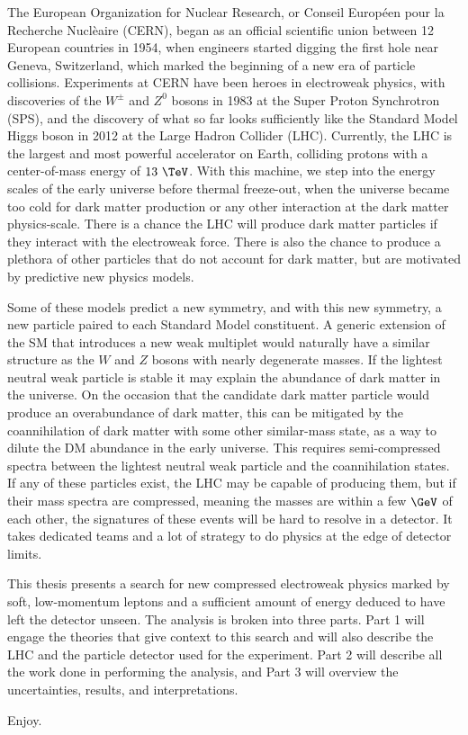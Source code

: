 The European Organization for Nuclear Research, or Conseil Europ\'een pour la Recherche Nucl\`eaire (CERN), began as an official scientific union between 12 European countries in 1954, when engineers started digging the first hole near Geneva, Switzerland, which marked the beginning of a new era of particle collisions.  Experiments at CERN have been heroes in electroweak physics, with discoveries of the $W^\pm$ and $Z^0$ bosons in 1983 at the Super Proton Synchrotron (SPS), and the discovery of what so far looks sufficiently like the Standard Model Higgs boson in 2012 at the Large Hadron Collider (LHC).  Currently, the LHC is the largest and most powerful accelerator on Earth, colliding protons with a center-of-mass energy of $13~\TeV$.  With this machine, we step into the energy scales of the early universe before thermal freeze-out, when the universe became too cold for dark matter production or any other interaction at the dark matter physics-scale.  There is a chance the LHC will produce dark matter particles if they interact with the electroweak force.  There is also the chance to produce a plethora of other particles that do not account for dark matter, but are motivated by predictive new physics models. 

Some of these models predict a new symmetry, and with this new symmetry, a new particle paired to each Standard Model constituent.  A generic extension of the SM that introduces a new weak multiplet would naturally have a similar structure as the $W$ and $Z$ bosons with nearly degenerate masses.  If the lightest neutral weak particle is stable it may explain the abundance of dark matter in the universe.  On the occasion that the candidate dark matter particle would produce an overabundance of dark matter, this can be mitigated by the coannihilation of dark matter with some other similar-mass state, as a way to dilute the DM abundance in the early universe.  This requires semi-compressed spectra between the lightest neutral weak particle and the coannihilation states.  If any of these particles exist, the LHC may be capable of producing them, but if their mass spectra are compressed, meaning the masses are within a few $\GeV$ of each other, the signatures of these events will be hard to resolve in a detector.  It takes dedicated teams and a lot of strategy to do physics at the edge of detector limits. 

This thesis presents a search for new compressed electroweak physics marked by soft, low-momentum leptons and a sufficient amount of energy deduced to have left the detector unseen.  The analysis is broken into three parts.  Part 1 will engage the theories that give context to this search and will also describe the LHC and the particle detector used for the experiment.  Part 2 will describe all the work done in performing the analysis, and Part 3 will overview the uncertainties, results, and interpretations.

Enjoy.







